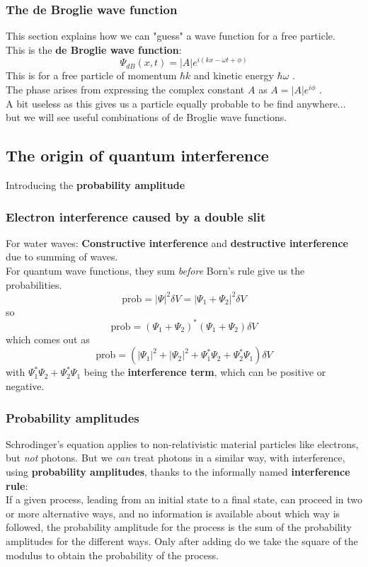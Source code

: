 \documentclass{article}
\begin{document}
\subsubsection{The de Broglie wave function}
This section explains how we can "guess" a wave function for a free particle.\\
This is the \textbf{de Broglie wave function}:
$$ \Psi_{dB}(x,t) = |A|e^{i(kx-\omega t + \phi)} $$
This is for a free particle of momentum $\hbar k$ and kinetic energy $\hbar \omega$ . \\
The phase arises from expressing the complex constant $A$ as $A = |A|e^{i\phi}$ . \\
A bit useless as this gives us a particle equally probable to be find anywhere... but we will see useful combinations of de Broglie wave functions.

\subsection{The origin of quantum interference}
Introducing the \textbf{probability amplitude}
\subsubsection{Electron interference caused by a double slit}
For water waves: \textbf{Constructive interference} and \textbf{destructive interference} due to summing of waves.\\
For quantum wave functions, they sum \emph{before} Born's rule give us the probabilities.
$$\mathrm{prob}=  \lvert \Psi \rvert ^2\delta V= \lvert \Psi_1+\Psi_2 \rvert ^2\delta V$$
so
$$\mathrm{prob}=(\Psi_1+\Psi_2)^*(\Psi_1+\Psi_2)\delta V$$
which comes out as
$$ \mathrm{prob} = (\lvert\Psi_1\rvert^2 + \lvert\Psi_2\rvert^2 + \Psi_1^* \Psi_2 + \Psi_2^* \Psi_1) \delta V $$
with $ \Psi_1^*\Psi_2 + \Psi_2^*\Psi_1 $ being the \textbf{interference term}, which can be positive or negative.\\
\subsubsection{Probability amplitudes}
Schrodinger's equation applies to non-relativistic material particles like electrons, but \emph{not} photons.
But we \emph{can} treat photons in a similar way, with interference, using \textbf{probability amplitudes}, thanks to the informally named \textbf{interference rule}:\\
If a given process, leading from an initial state to a final state, can proceed in two or more alternative ways, and no information is available about which way is followed, the probability amplitude for the process is the sum of the probability amplitudes for the different ways. Only after adding do we take the square of the modulus to obtain the probability of the process.
\end{document}

